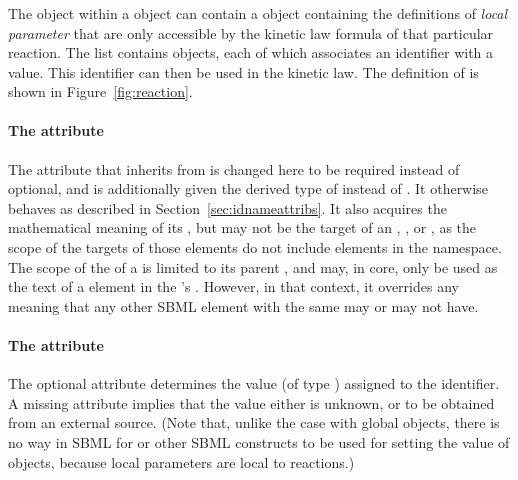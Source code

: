 \subsubsection{}
\label{subsec:localparameter}

The \KineticLaw object within a \Reaction object can contain a
\ListOfLocalParameters object containing the definitions of
\emph{local parameter} that are only accessible by the kinetic law
formula of that particular reaction.  The list contains
\LocalParameter objects, each of which associates an identifier
with a value.  This identifier can then be used in the kinetic
law.  The definition of \LocalParameter is shown in
Figure~\vref{fig:reaction}.


\begin{blockChanged}
\paragraph{The  attribute}

The  attribute that \LocalParameter inherits from \SBase is changed here to be required instead of optional, and is additionally given the derived type of  instead of .  It otherwise behaves as described in Section~\ref{sec:idnameattribs}.  It also acquires the mathematical meaning of its , but may not be the target of an \InitialAssignment, \EventAssignment, or \Rule, as the scope of the targets of those elements do not include elements in the  namespace.  The scope of the  of a \LocalParameter is limited to its parent \KineticLaw, and may, in core, only be used as the text of a  element in the \KineticLaw's .  However, in that context, it overrides any meaning that any other SBML element with the same  may or may not have.
\end{blockChanged}

\paragraph{The  attribute}

The optional attribute  determines the value (of type
) assigned to the identifier.  A missing
 attribute implies that the value either is unknown,
or to be obtained from an external source.  (Note that, unlike the
case with global \Parameter objects, there is no way in SBML
\thisLV for \InitialAssignment or other SBML constructs to be used
for setting the value of \LocalParameter objects, because local
parameters are local to reactions.)


